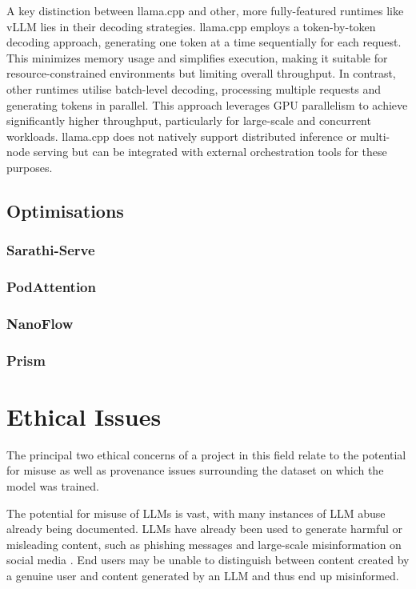 \documentclass[12pt,twoside]{report}
\begin{document}
A key distinction between llama.cpp and other, more fully-featured runtimes like vLLM lies in their decoding strategies. 
llama.cpp employs a token-by-token decoding approach, generating one token at a time sequentially for each request. 
This minimizes memory usage and simplifies execution, making it suitable for resource-constrained environments but limiting overall throughput.
In contrast, other runtimes utilise batch-level decoding, processing multiple requests and generating tokens in parallel.
This approach leverages GPU parallelism to achieve significantly higher throughput, particularly for large-scale and concurrent workloads.
llama.cpp does not natively support distributed inference or multi-node serving but can be integrated with external orchestration tools \cite{ray} for these purposes.

\section{Optimisations}\label{section:optimisations}
\subsection{Sarathi-Serve}
\subsection{PodAttention}
\subsection{NanoFlow}
\subsection{Prism}


\chapter{Ethical Issues} %
The principal two ethical concerns of a project in this field relate to the potential for misuse as well as provenance issues surrounding the dataset on which the model was trained.

The potential for misuse of LLMs is vast, with many instances of LLM abuse already being documented.
LLMs have already been used to generate harmful or misleading content, such as phishing messages \cite{hazell2023spear} and large-scale misinformation on social media \cite{williams2024large}.
End users may be unable to distinguish between content created by a genuine user and content generated by an LLM and thus end up misinformed.
\end{document}
